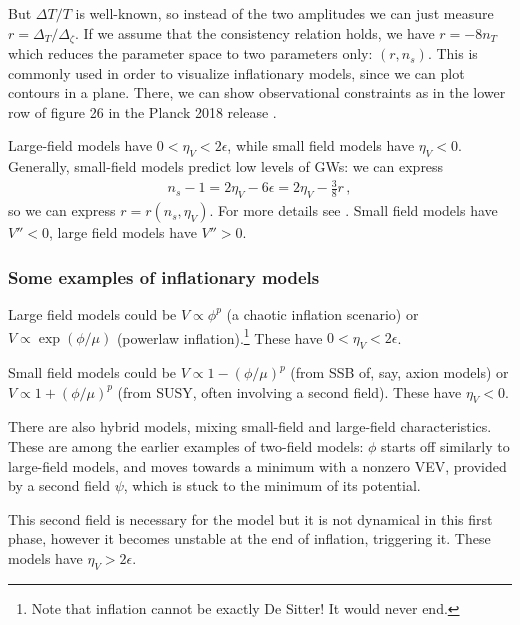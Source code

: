 \documentclass[main.tex]{subfiles}
\begin{document}
But \(\Delta T / T\) is well-known, so instead of the two amplitudes we can just measure \(r = \Delta _T / \Delta _\zeta \). 
If we assume that the consistency relation holds, we have \(r = - 8 n_T\)
which reduces the parameter space to two parameters only: \((r, n_s)\). 
This is commonly used in order to visualize inflationary models, since we can plot contours in a plane. 
There, we can show observational constraints as in the lower row of figure 26 in the Planck 2018 release \cite[]{planckcollaborationPlanck2018Results2019}.

Large-field models have \(0 < \eta _V < 2 \epsilon \), while small field models have \(\eta _V < 0\). 
Generally, small-field models predict low levels of GWs: we can express 
%
\begin{align}
n_s -1 = 2 \eta _V - 6 \epsilon = 2 \eta _V - \frac{3}{8} r
\,,
\end{align}
%
so we can express \(r = r (n_s, \eta _V )\). 
For more details see \textcite[]{kinneyNewConstraintsInflation2000}.
Small field models have \(V'' < 0\), large field models have \(V'' > 0\). 

\subsubsection{Some examples of inflationary models}

Large field models could be \(V \propto \phi^{p}\) (a chaotic inflation scenario) or \(V \propto \exp(\phi / \mu )\) (powerlaw inflation).\footnote{Note that inflation cannot be exactly De Sitter! It would never end.} These have \(0 < \eta _V < 2 \epsilon \). 

Small field models could be \(V \propto
1 - (\phi / \mu )^{p}\) (from SSB of, say, axion models) or \(V \propto 1 + (\phi / \mu )^{p}\) (from SUSY, often involving a second field). 
These have \(\eta _V < 0 \). 

There are also hybrid models, mixing small-field and large-field characteristics.
These are among the earlier examples of two-field models: \(\phi \) starts off similarly to large-field models, and moves towards a minimum with a nonzero VEV, provided by a second field \(\psi \), which is stuck to the minimum of its potential.

This second field is necessary for the model but it is not dynamical in this first phase, however it becomes unstable at the end of inflation, triggering it. 
These models have \(\eta _V > 2 \epsilon \). 
\end{document}
